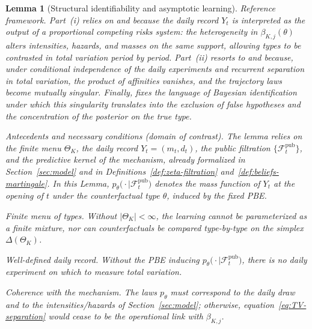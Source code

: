 \documentclass[ecta,nameyear,draft]{econsocart}
\theoremstyle{plain}
\newtheorem{lemma}[theorem]{Lemma}
\theoremstyle{definition}
\newcommand{\ThetaK}{\Theta_K}
\newcommand{\1}{\mathbf{1}}
\begin{document}
\begin{lemma}[Structural identifiability and asymptotic learning]\label{lem:hazard-separation}
\normalfont
Reference framework. Part~\textup{(i)} relies on \citet{Cox1972} and \citet{Bradburn2003} because the daily record $Y_t$ is interpreted as the output of a proportional competing risks system: the heterogeneity in $\beta_{K,j}(\theta)$ alters intensities, hazards, and masses on the same support, allowing types to be contrasted in total variation period by period. Part~\textup{(ii)} resorts to \citet{Kakutani1948} and \citet{Shiryaev2019Probability} because, under conditional independence of the daily experiments and recurrent separation in total variation, the product of affinities vanishes, and the trajectory laws become mutually singular. Finally, \citet{Schervish1995Theory} fixes the language of Bayesian identification under which this singularity translates into the exclusion of false hypotheses and the concentration of the posterior on the true type.

\medskip
\noindent Antecedents and necessary conditions \textup{(}domain of contrast\textup{)}.
The lemma relies on the finite menu $\ThetaK$, the daily record $Y_t=(m_t,d_t)$, the public filtration $\{\mathcal{F}_t^{\mathrm{pub}}\}$, and the predictive kernel of the mechanism, already formalized in Section~\ref{sec:model} and in Definitions~\ref{def:zeta-filtration} and~\ref{def:beliefs-martingale}. In this Lemma, $p_\theta\bigl(\cdot\mid \mathcal{F}_t^{\mathrm{pub}}\bigr)$ denotes the mass function of $Y_t$ at the opening of $t$ under the counterfactual type $\theta$, induced by the fixed PBE.
\begin{list}{}{%
  \setlength{\leftmargin}{2.25em}%
  \setlength{\labelwidth}{2.25em}%
  \setlength{\labelsep}{0.45em}%
  \setlength{\itemsep}{0.35em}%
  \setlength{\parsep}{0pt}%
  \setlength{\topsep}{0.25em}%
}
\item[\textup{(N1)}] \textup{Finite menu of types.}\quad
Without $\lvert\ThetaK\rvert<\infty$, the learning cannot be parameterized as a finite mixture, nor can counterfactuals be compared type-by-type on the simplex $\Delta(\ThetaK)$.
\item[\textup{(N2)}] \textup{Well-defined daily record.}\quad
Without the PBE inducing $p_\theta\bigl(\cdot\mid\mathcal{F}_t^{\mathrm{pub}}\bigr)$, there is no daily experiment on which to measure total variation.
\item[\textup{(N3)}] \textup{Coherence with the mechanism.}\quad
The laws $p_\theta$ must correspond to the daily draw and to the intensities/hazards of Section~\ref{sec:model}; otherwise, equation~\eqref{eq:TV-separation} would cease to be the operational link with $\beta_{K,j}$.
\end{list}


\end{lemma}
\end{document}
